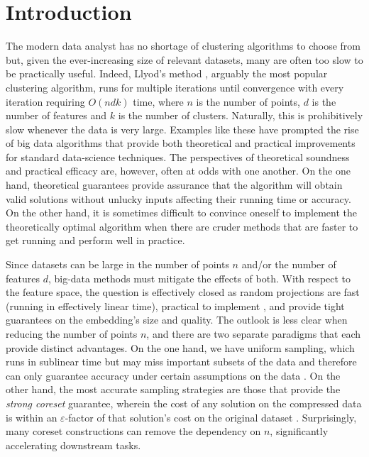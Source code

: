\section{Introduction}

The modern data analyst has no shortage of clustering algorithms to choose from but, given the ever-increasing size of relevant datasets, many are often too
slow to be practically useful.  Indeed, Llyod's method \cite{Lloyd82}, arguably the most popular clustering algorithm, runs for multiple iterations until
convergence with every iteration requiring $O(ndk)$ time, where $n$ is the number of points, $d$ is the number of features and $k$ is the number of clusters.
Naturally, this is prohibitively slow whenever the data is very large. Examples like these have prompted the rise of big data algorithms that provide both
theoretical and practical improvements for standard data-science techniques. The perspectives of theoretical soundness and practical efficacy are, however,
often at odds with one another. On the one hand, theoretical guarantees provide assurance that the algorithm will obtain valid solutions without unlucky inputs
affecting their running time or accuracy. On the other hand, it is sometimes difficult to convince oneself to implement the theoretically optimal algorithm when
there are cruder methods that are faster to get running and perform well in practice.

Since datasets can be large in the number of points $n$ and/or the number of features $d$, big-data methods must mitigate the effects of both.  With respect to
the feature space, the question is effectively closed as random projections are fast (running in effectively linear time), practical to implement
\cite{MakarychevMR19}, and provide tight guarantees on the embedding's size and quality. The outlook is less clear when reducing the number of points
$n$, and there are two separate paradigms that each provide distinct advantages.  On the one hand, we have uniform sampling, which runs in sublinear time but
may miss important subsets of the data and therefore can only guarantee accuracy under certain assumptions on the data \cite{HJJ23}.  On the other hand, the
most accurate sampling strategies are those that provide the \emph{strong coreset} guarantee, wherein the cost of any solution on the compressed data is within
an $\varepsilon$-factor of that solution's cost on the original dataset \cite{CSS21}.  Surprisingly, many coreset constructions can remove the dependency on
$n$, significantly accelerating downstream tasks.

